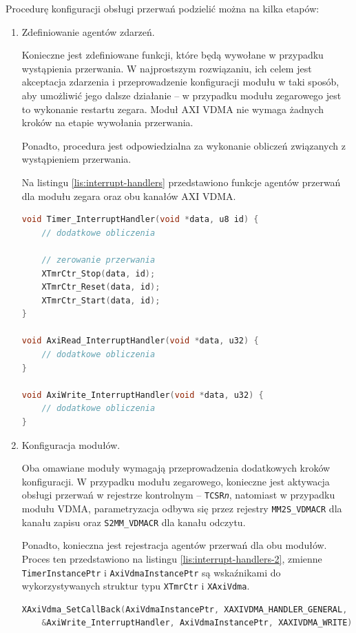 Procedurę konfiguracji obsługi przerwań podzielić można na kilka etapów:
\begin{enumerate}
	\item Zdefiniowanie agentów zdarzeń.
	
Konieczne jest zdefiniowane funkcji, które będą wywołane w przypadku wystąpienia przerwania. 
W najprostszym rozwiązaniu, ich celem jest akceptacja zdarzenia i przeprowadzenie konfiguracji modułu w taki sposób, aby umożliwić jego dalsze działanie -- w przypadku modułu zegarowego jest to wykonanie restartu zegara. 
Moduł AXI VDMA nie wymaga żadnych kroków na etapie wywołania przerwania.

Ponadto, procedura jest odpowiedzialna za wykonanie obliczeń związanych z wystąpieniem przerwania.

Na listingu \ref{lis:interrupt-handlers} przedstawiono funkcje agentów przerwań dla modułu zegara oraz obu kanałów AXI VDMA.

\begin{lstlisting}[breaklines=true, language=C, caption=Procedury obsługi przerwań., label=lis:interrupt-handlers]
void Timer_InterruptHandler(void *data, u8 id) {
	// dodatkowe obliczenia
	
	// zerowanie przerwania
	XTmrCtr_Stop(data, id);
	XTmrCtr_Reset(data, id);
	XTmrCtr_Start(data, id);
}

void AxiRead_InterruptHandler(void *data, u32) {
	// dodatkowe obliczenia
}

void AxiWrite_InterruptHandler(void *data, u32) {
	// dodatkowe obliczenia
}
\end{lstlisting}

	\item Konfiguracja modułów.
	
Oba omawiane moduły wymagają przeprowadzenia dodatkowych kroków konfiguracji. 
W przypadku modułu zegarowego, konieczne jest aktywacja obsługi przerwań w rejestrze kontrolnym -- \texttt{TCSR\textit{n}}, natomiast w przypadku modułu VDMA, parametryzacja odbywa się przez rejestry \texttt{MM2S\_VDMACR} dla kanału zapisu oraz \texttt{S2MM\_VDMACR} dla kanału odczytu.

Ponadto, konieczna jest rejestracja agentów przerwań dla obu modułów. 
Proces ten przedstawiono na listingu \ref{lis:interrupt-handlers-2}, zmienne \texttt{TimerInstancePtr} i \texttt{AxiVdmaInstancePtr} są wskaźnikami do wykorzystywanych struktur typu \texttt{XTmrCtr} i \texttt{XAxiVdma}.

\begin{lstlisting}[language=C, caption=Rejestracja agentów przerwań., label=lis:interrupt-handlers-2]
XAxiVdma_SetCallBack(AxiVdmaInstancePtr, XAXIVDMA_HANDLER_GENERAL,
	&AxiWrite_InterruptHandler, AxiVdmaInstancePtr, XAXIVDMA_WRITE);


\end{lstlisting}
\end{enumerate}
